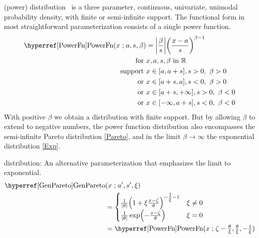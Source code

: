 



\label{sec:PowerFn}


 (power) distribution~\cite{Pearson1916, Meniconi1996,Johnson1995} 
is  a three parameter, continuous, univariate, unimodal probability density, with finite or semi-infinite support. The functional form in most straightforward  parameterization consists of a single power function.
\begin{align}
\label{PowerFn}
\opr{PowerFn}(x\given a,s,\beta) &= 
\Left|\frac{\beta}{ s}\Right|
\Left(\frac{x-a}{s} \Right)^{\beta -1} \checked
\\
\notag  \text{for } & x, a, s, \beta \text{ in } \mathbb{R}
 \\ \text{ support } & x \in [a,a+s], s>0,\ \beta>0 \notag \checked
  \\ \text{ or } &  x\in[a+s,a], s<0,\ \beta>0  \checked
 \notag 
 \\  \notag  \text{ or } &  x\in[a+s,+\infty], s>0,\ \beta<0 \checked
 \\  \notag  \text{ or } &  x\in[-\infty,a+s], s<0,\ \beta<0 \checked
 \notag
\end{align}
%
With positive $\beta$ we obtain a distribution with finite support. But by allowing $\beta$ to extend to negative numbers, the power function distribution also encompasses the semi-infinite Pareto distribution \eqref{Pareto}, and in the limit $\beta\rightarrow\infty$ the exponential distribution \eqref{Exp}.



 distribution: An alternative parameterization that emphasizes the limit to exponential.
\begin{align}
\label{GenPareto}
\opr{GenPareto}&(x\given a',s',\xi) 
\\ & =
 \begin{cases}
  \frac{1}{|\theta|}\Left( 1 + \xi \frac{x-\pLoc}{\theta}\Right)^{-\tfrac{1}{\xi}-1} & \xi \neq 0 \checked
\notag
\\ 
 \frac{1}{|\theta|} \exp \Left(-\frac{x-\pLoc}{\theta} \Right)& \xi = 0 \checked
\notag
\end{cases}
\\
& = \opr{PowerFn}(x\given \pLoc-\tfrac{\theta}{\xi},\tfrac{\theta}{\xi},  -\tfrac{1}{\xi}) \checked
\notag
\end{align}



